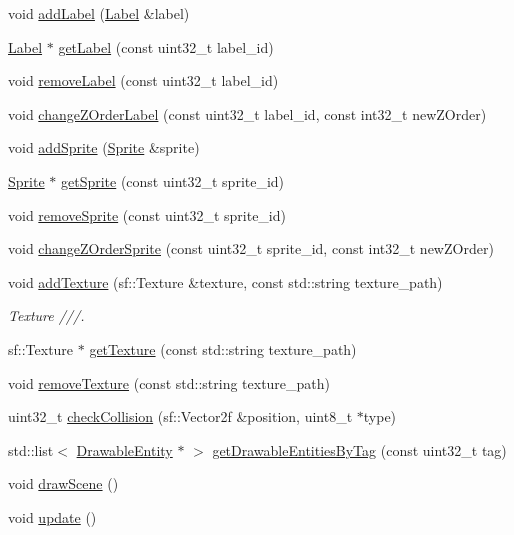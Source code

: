 \begin{DoxyCompactItemize}
\item 
void \hyperlink{class_scene_a4327310c11ae2f3130ddb61ed20cfda3}{add\+Label} (\hyperlink{class_label}{Label} \&label)
\item 
\hyperlink{class_label}{Label} $\ast$ \hyperlink{class_scene_aa65487dbbc075503ccf386df47b5cbc8}{get\+Label} (const uint32\+\_\+t label\+\_\+id)
\item 
void \hyperlink{class_scene_ac8e9f99810684c6bd397477972691cb8}{remove\+Label} (const uint32\+\_\+t label\+\_\+id)
\item 
void \hyperlink{class_scene_ac7dc181963c83afe8d3863e4226a3bd2}{change\+Z\+Order\+Label} (const uint32\+\_\+t label\+\_\+id, const int32\+\_\+t new\+Z\+Order)
\item 
void \hyperlink{class_scene_ac7bada9fa9ea8dbeee358693b44e540e}{add\+Sprite} (\hyperlink{class_sprite}{Sprite} \&sprite)
\item 
\hyperlink{class_sprite}{Sprite} $\ast$ \hyperlink{class_scene_a45418063b55b68e440cac7fab52e3c51}{get\+Sprite} (const uint32\+\_\+t sprite\+\_\+id)
\item 
void \hyperlink{class_scene_a6033b04f27e305069727d210e86b3902}{remove\+Sprite} (const uint32\+\_\+t sprite\+\_\+id)
\item 
void \hyperlink{class_scene_a3913b5c955c938f6bbd84d3e78bebcad}{change\+Z\+Order\+Sprite} (const uint32\+\_\+t sprite\+\_\+id, const int32\+\_\+t new\+Z\+Order)
\item 
void \hyperlink{class_scene_ad7c686656e9ad8e20f85f7997c4bc747}{add\+Texture} (sf\+::\+Texture \&texture, const std\+::string texture\+\_\+path)
\begin{DoxyCompactList}\small\item\em Texture ///. \end{DoxyCompactList}\item 
sf\+::\+Texture $\ast$ \hyperlink{class_scene_a1c7233bcc955b7b71156b31205ec2360}{get\+Texture} (const std\+::string texture\+\_\+path)
\item 
void \hyperlink{class_scene_a6418fa4353c7d079b42e11af7343c8a9}{remove\+Texture} (const std\+::string texture\+\_\+path)
\item 
uint32\+\_\+t \hyperlink{class_scene_a8a29c60fda35f60e0d2ab54b497955ec}{check\+Collision} (sf\+::\+Vector2f \&position, uint8\+\_\+t $\ast$type)
\item 
std\+::list$<$ \hyperlink{class_drawable_entity}{Drawable\+Entity} $\ast$ $>$ \hyperlink{class_scene_a53baaa91f1356e5fe9abc9b5a1cffb94}{get\+Drawable\+Entities\+By\+Tag} (const uint32\+\_\+t tag)
\item 
void \hyperlink{class_scene_ae27f4327ca363cc9cad8ab553504e2d5}{draw\+Scene} ()
\item 
void \hyperlink{class_scene_aa24c7e636c10e4e42650c1374b90bb80}{update} ()
\end{DoxyCompactItemize}


